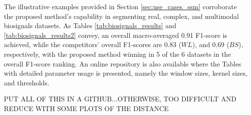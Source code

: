 \begin{table}[H]
    \centering
    \caption{Results to summarize the comparison between the methods tested. In this table, each record of each dataset is counted for each method as a win, draw or loss. The count is made for each dataset and finally, for all datasets altogether (W|D|L).}
    \label{tab:biosignals_results2}
\end{table}

The illustrative examples provided in Section \ref{sec:use_cases_ssm} corroborate the proposed method's capability in segmenting real, complex, and multimodal biosignals datasets. As Tables \ref{tab:biosignals_results} and \ref{tab:biosignals_results2} convey, an overall macro-averaged 0.91 F1-score is achieved, while the competitors' overall F1-scores are 0.83 ($WL$), and 0.69 ($BS$), respectively, with the proposed method winning in 5 of the 6 datasets in the overall F1-score ranking. An online repository is also available where the Tables with detailed parameter usage is presented, namely the window sizes, kernel sizes, and thresholds.


{\LARGE{PUT ALL OF THIS IN A GITHUB...OTHERWISE, TOO DIFFICULT AND REDUCE WITH SOME PLOTS OF THE DISTANCE}}

